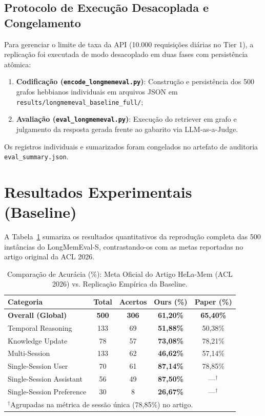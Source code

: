 \documentclass[10pt,conference,twocolumn]{IEEEtran}
\begin{document}
\subsection{Protocolo de Execução Desacoplada e Congelamento}
Para gerenciar o limite de taxa da API (10.000 requisições diárias no Tier 1), a replicação foi executada de modo desacoplado em duas fases com persistência atômica:
\begin{enumerate}
    \item \textbf{Codificação (\texttt{encode\_longmemeval.py})}: Construção e persistência dos 500 grafos hebbianos individuais em arquivos JSON em \texttt{results/longmemeval\_baseline\_full/};
    \item \textbf{Avaliação (\texttt{eval\_longmemeval.py})}: Execução do retriever em grafo e julgamento da resposta gerada frente ao gabarito via LLM-as-a-Judge.
\end{enumerate}
Os registros individuais e sumarizados foram congelados no artefato de auditoria \texttt{eval\_summary.json}.

\section{Resultados Experimentais (Baseline)}

A Tabela~\ref{tab:resultados} sumariza os resultados quantitativos da reprodução completa das 500 instâncias do LongMemEval-S, contrastando-os com as metas reportadas no artigo original da ACL 2026.

\begin{table}[htbp]
\caption{Comparação de Acurácia (\%): Meta Oficial do Artigo HeLa-Mem (ACL 2026) vs. Replicação Empírica da Baseline.}
\label{tab:resultados}
\centering
\scriptsize
\setlength{\tabcolsep}{4pt}
\begin{tabular}{lcccc}
\toprule
\textbf{Categoria} & \textbf{Total} & \textbf{Acertos} & \textbf{Ours (\%)} & \textbf{Paper (\%)} \\
\midrule
\textbf{Overall (Global)} & \textbf{500} & \textbf{306} & \textbf{61,20\%} & \textbf{65,40\%} \\
\midrule
Temporal Reasoning & 133 & 69 & \textbf{51,88\%} & 50,38\% \\
Knowledge Update & 78 & 57 & \textbf{73,08\%} & 78,21\% \\
Multi-Session & 133 & 62 & \textbf{46,62\%} & 57,14\% \\
Single-Session User & 70 & 61 & \textbf{87,14\%} & 78,85\% \\
Single-Session Assistant & 56 & 49 & \textbf{87,50\%} & ---$^\dagger$ \\
Single-Session Preference & 30 & 8 & \textbf{26,67\%} & ---$^\dagger$ \\
\bottomrule
\multicolumn{5}{l}{\footnotesize $^\dagger$Agrupadas na métrica de sessão única (78,85\%) no artigo.}
\end{tabular}
\end{table}
\end{document}
